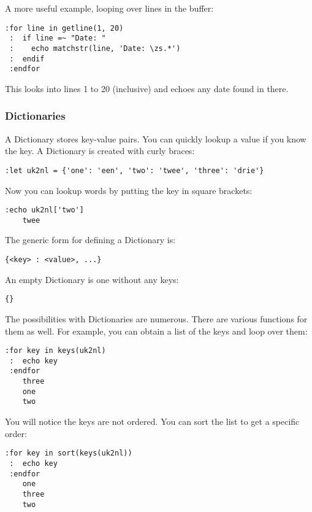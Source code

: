 A more useful example, looping over lines in the buffer:

\begin{Verbatim}[samepage=true]
 :for line in getline(1, 20)
 :  if line =~ "Date: "
 :    echo matchstr(line, 'Date: \zs.*')
 :  endif
 :endfor
\end{Verbatim}

This looks into lines 1 to 20 (inclusive) and echoes any date found in there.
\subsubsection{Dictionaries}
A Dictionary stores key-value pairs.
You can quickly lookup a value if you know the key.
A Dictionary is created with curly braces:

\begin{Verbatim}[samepage=true]
 :let uk2nl = {'one': 'een', 'two': 'twee', 'three': 'drie'}
\end{Verbatim}

Now you can lookup words by putting the key in square brackets:

\begin{Verbatim}[samepage=true]
 :echo uk2nl['two']
    twee
\end{Verbatim}

The generic form for defining a Dictionary is:

\begin{Verbatim}[samepage=true]
 {<key> : <value>, ...}
\end{Verbatim}

An empty Dictionary is one without any keys:

\begin{Verbatim}[samepage=true]
 {}
\end{Verbatim}

The possibilities with Dictionaries are numerous.
There are various functions for them as well.
For example, you can obtain a list of the keys and loop over them:

\begin{Verbatim}[samepage=true]
 :for key in keys(uk2nl)
 :  echo key
 :endfor
    three
    one
    two
\end{Verbatim}

You will notice the keys are not ordered.
You can sort the list to get a specific order:

\begin{Verbatim}[samepage=true]
 :for key in sort(keys(uk2nl))
 :  echo key
 :endfor
    one
    three
    two
\end{Verbatim}

